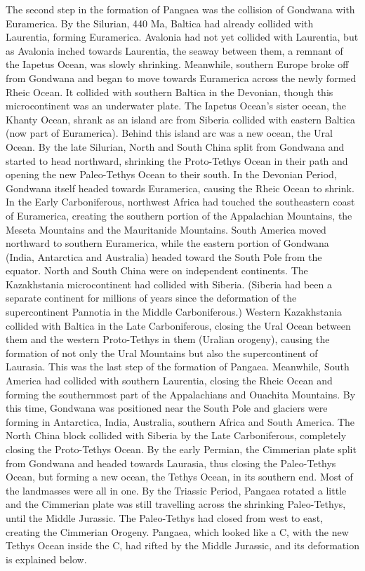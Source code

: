 The second step in the formation of Pangaea was the collision of Gondwana with Euramerica. By the Silurian, 440 Ma, Baltica had already collided with Laurentia, forming Euramerica. Avalonia had not yet collided with Laurentia, but as Avalonia inched towards Laurentia, the seaway between them, a remnant of the Iapetus Ocean, was slowly shrinking. Meanwhile, southern Europe broke off from Gondwana and began to move towards Euramerica across the newly formed Rheic Ocean. It collided with southern Baltica in the Devonian, though this microcontinent was an underwater plate. The Iapetus Ocean's sister ocean, the Khanty Ocean, shrank as an island arc from Siberia collided with eastern Baltica (now part of Euramerica). Behind this island arc was a new ocean, the Ural Ocean.
By the late Silurian, North and South China split from Gondwana and started to head northward, shrinking the Proto-Tethys Ocean in their path and opening the new Paleo-Tethys Ocean to their south. In the Devonian Period, Gondwana itself headed towards Euramerica, causing the Rheic Ocean to shrink. In the Early Carboniferous, northwest Africa had touched the southeastern coast of Euramerica, creating the southern portion of the Appalachian Mountains, the Meseta Mountains and the Mauritanide Mountains. South America moved northward to southern Euramerica, while the eastern portion of Gondwana (India, Antarctica and Australia) headed toward the South Pole from the equator. North and South China were on independent continents. The Kazakhstania microcontinent had collided with Siberia. (Siberia had been a separate continent for millions of years since the deformation of the supercontinent Pannotia in the Middle Carboniferous.)
Western Kazakhstania collided with Baltica in the Late Carboniferous, closing the Ural Ocean between them and the western Proto-Tethys in them (Uralian orogeny), causing the formation of not only the Ural Mountains but also the supercontinent of Laurasia. This was the last step of the formation of Pangaea. Meanwhile, South America had collided with southern Laurentia, closing the Rheic Ocean and forming the southernmost part of the Appalachians and Ouachita Mountains. By this time, Gondwana was positioned near the South Pole and glaciers were forming in Antarctica, India, Australia, southern Africa and South America. The North China block collided with Siberia by the Late Carboniferous, completely closing the Proto-Tethys Ocean.
By the early Permian, the Cimmerian plate split from Gondwana and headed towards Laurasia, thus closing the Paleo-Tethys Ocean, but forming a new ocean, the Tethys Ocean, in its southern end. Most of the landmasses were all in one. By the Triassic Period, Pangaea rotated a little and the Cimmerian plate was still travelling across the shrinking Paleo-Tethys, until the Middle Jurassic. The Paleo-Tethys had closed from west to east, creating the Cimmerian Orogeny. Pangaea, which looked like a C, with the new Tethys Ocean inside the C, had rifted by the Middle Jurassic, and its deformation is explained below.
